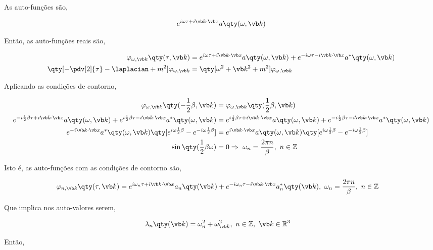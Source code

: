 \documentclass[twoside]{amsart}
\numberwithin{equation}{section}
\begin{document}
\begin{refsection}
As auto-funções são,

\begin{align}
    e^{i\omega\tau+i\vb k\cdot\vb x}a\qty(\omega,\vb k)
\end{align}

Então, as auto-funções reais são,

\begin{align}
    \varphi_{\omega,\vb k}\qty(\tau,\vb k)&=e^{i\omega\tau+i\vb k\cdot\vb x}a\qty(\omega,\vb k)+e^{-i\omega\tau-i\vb k\cdot\vb x}a^\ast\qty(\omega,\vb k)\\
    \qty[-\pdv[2]{\tau}-\laplacian+m^2]\varphi_{\omega,\vb k}&=\qty[\omega^2+\vb k^2+m^2]\varphi_{\omega,\vb k}
\end{align}

Aplicando as condições de contorno,

\begin{align}
    \varphi_{\omega,\vb k}\qty(-\frac12\beta,\vb k)&=\varphi_{\omega,\vb k}\qty(\frac12\beta,\vb k)\\
    e^{-i\frac12\beta\tau+i\vb k\cdot\vb x}a\qty(\omega,\vb k)+e^{i\frac12\beta\tau-i\vb k\cdot\vb x}a^\ast\qty(\omega,\vb k)&=e^{i\frac12\beta\tau+i\vb k\cdot\vb x}a\qty(\omega,\vb k)+e^{-i\frac12\beta\tau-i\vb k\cdot\vb x}a^\ast\qty(\omega,\vb k)\\
    e^{-i\vb k\cdot\vb x}a^\ast\qty(\omega,\vb k)\qty[e^{i\omega\frac12\beta}-e^{-i\omega\frac12\beta}]&=e^{i\vb k\cdot\vb x}a\qty(\omega,\vb k)\qty[e^{i\omega\frac12\beta}-e^{-i\omega\frac12\beta}]\\
    \sin\qty(\frac12\beta\omega)&=0\Rightarrow\ \omega_n=\frac{2\pi n}{\beta},\ n\in\mathbb Z
\end{align}

Isto é, as auto-funções com as condições de contorno são,

\begin{align}
    \varphi_{n,\vb k}\qty(\tau,\vb k)&=e^{i\omega_n\tau+i\vb k\cdot\vb x}a_n\qty(\vb k)+e^{-i\omega_n\tau-i\vb k\cdot\vb x}a_n^\ast\qty(\vb k),\ \omega_n=\frac{2\pi n}{\beta},\ n\in\mathbb Z
\end{align}

Que implica nos auto-valores serem,

\begin{align}
    \lambda_n\qty(\vb k)&=\omega_n^2+\omega_{\vb k}^2,\ n\in\mathbb Z,\ \vb k \in\mathbb R^3
\end{align}

Então,


\end{refsection}
\end{document}
